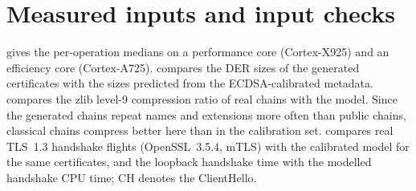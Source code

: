 \documentclass[preprint,12pt]{elsarticle}
\begin{document}
\section{Measured inputs and input checks}
\label{app:meas}
 gives the per-operation medians on a performance core (Cortex-X925) and an efficiency core (Cortex-A725).  compares the DER sizes of the generated certificates with the sizes predicted from the ECDSA-calibrated metadata.  compares the zlib level-9 compression ratio of real chains with the model. Since the generated chains repeat names and extensions more often than public chains, classical chains compress better here than in the calibration set.  compares real TLS~1.3 handshake flights (OpenSSL~3.5.4, mTLS) with the calibrated model for the same certificates, and the loopback handshake time with the modelled handshake CPU time; CH denotes the ClientHello.
\end{document}
